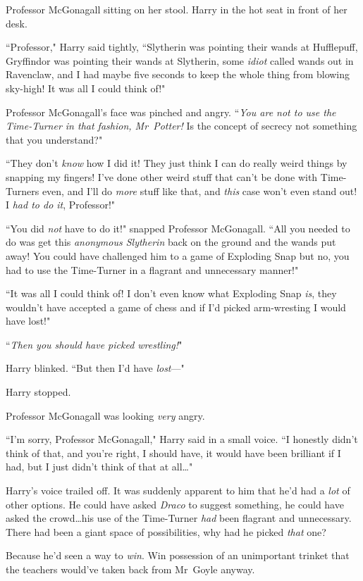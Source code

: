 Professor McGonagall sitting on her stool. Harry in the hot seat in front of her desk.

``Professor," Harry said tightly, ``Slytherin was pointing their wands at Hufflepuff, Gryffindor was pointing their wands at Slytherin, some \emph{idiot} called wands out in Ravenclaw, and I had maybe five seconds to keep the whole thing from blowing sky-high! It was all I could think of!"

Professor McGonagall's face was pinched and angry. ``\emph{You are not to use the Time-Turner in that fashion, Mr~Potter!} Is the concept of secrecy not something that you understand?"

``They don't \emph{know} how I did it! They just think I can do really weird things by snapping my fingers! I've done other weird stuff that can't be done with Time-Turners even, and I'll do \emph{more} stuff like that, and \emph{this} case won't even stand out! I \emph{had to do it}, Professor!"

``You did \emph{not} have to do it!" snapped Professor McGonagall. ``All you needed to do was get this \emph{anonymous Slytherin} back on the ground and the wands put away! You could have challenged him to a game of Exploding Snap but no, you had to use the Time-Turner in a flagrant and unnecessary manner!"

``It was all I could think of! I don't even know what Exploding Snap \emph{is}, they wouldn't have accepted a game of chess and if I'd picked arm-wresting I would have lost!"

``\emph{Then you should have picked wrestling!}"

Harry blinked. ``But then I'd have \emph{lost}—"

Harry stopped.

Professor McGonagall was looking \emph{very} angry.

``I'm sorry, Professor McGonagall," Harry said in a small voice. ``I honestly didn't think of that, and you're right, I should have, it would have been brilliant if I had, but I just didn't think of that at all…"

Harry's voice trailed off. It was suddenly apparent to him that he'd had a \emph{lot} of other options. He could have asked \emph{Draco} to suggest something, he could have asked the crowd…his use of the Time-Turner \emph{had} been flagrant and unnecessary. There had been a giant space of possibilities, why had he picked \emph{that} one?

Because he'd seen a way to \emph{win}. Win possession of an unimportant trinket that the teachers would've taken back from Mr~Goyle anyway.

